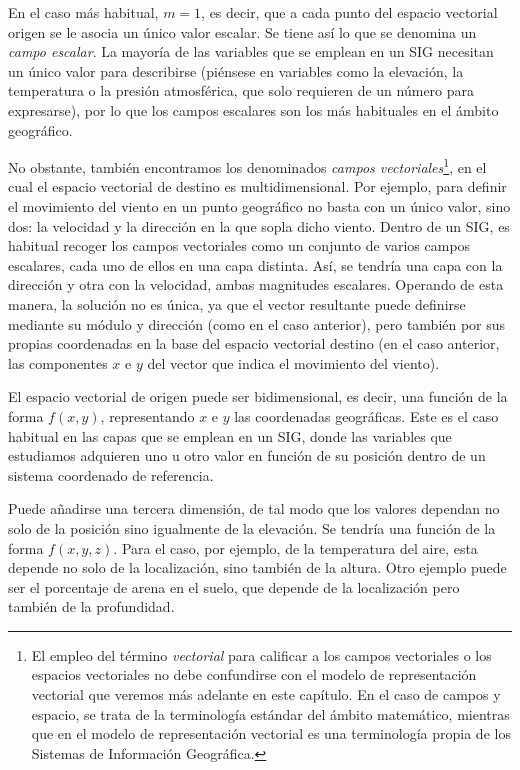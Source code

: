 \begin{multicols}{2}
En el caso más habitual, $m=1$, es decir, que a cada punto del espacio vectorial origen se le asocia un único valor escalar. Se tiene así lo que se denomina un \emph{campo escalar}. La mayoría de las variables que se emplean en un SIG necesitan un único valor para describirse (piénsese en variables como la elevación, la temperatura o la presión atmosférica, que solo requieren de un número para expresarse), por lo que los campos escalares son los más habituales en el ámbito geográfico. 

 
No obstante, también encontramos los denominados \emph{campos vectoriales}\footnote{El empleo del término \emph{vectorial} para calificar a los campos vectoriales o los espacios vectoriales no debe confundirse con el modelo de representación vectorial que veremos más adelante en este capítulo. En el caso de campos y espacio, se trata de la terminología estándar del ámbito matemático, mientras que en el modelo de representación vectorial es una terminología propia de los Sistemas de Información Geográfica.}, en el cual el espacio vectorial de destino es multidimensional. Por ejemplo, para definir el movimiento del viento en un punto geográfico no basta con un único valor, sino dos: la velocidad y la dirección en la que sopla dicho viento. Dentro de un SIG, es habitual recoger los campos vectoriales como un conjunto de varios campos escalares, cada uno de ellos en una capa distinta. Así, se tendría una capa con la dirección y otra con la velocidad, ambas magnitudes escalares. Operando de esta manera, la solución no es única, ya que el vector resultante puede definirse mediante su módulo y dirección (como en el caso anterior), pero también por sus propias coordenadas en la base del espacio vectorial destino (en el caso anterior, las componentes $x$ e $y$ del vector que indica el movimiento del viento).


El espacio vectorial de origen puede ser bidimensional, es decir, una función de la forma $f(x,y)$, representando $x$ e $y$ las coordenadas geográficas. Este es el caso habitual en las capas que se emplean en un SIG, donde las variables que estudiamos adquieren uno u otro valor en función de su posición dentro de un sistema coordenado de referencia.

Puede añadirse una tercera dimensión, de tal modo que los valores dependan no solo de la posición sino igualmente de la elevación. Se tendría una función de la forma $f(x,y,z)$. Para el caso, por ejemplo, de la temperatura del aire, esta depende no solo de la localización, sino también de la altura. Otro ejemplo puede ser el porcentaje de arena en el suelo, que depende de la localización pero también de la profundidad.


\end{multicols}
